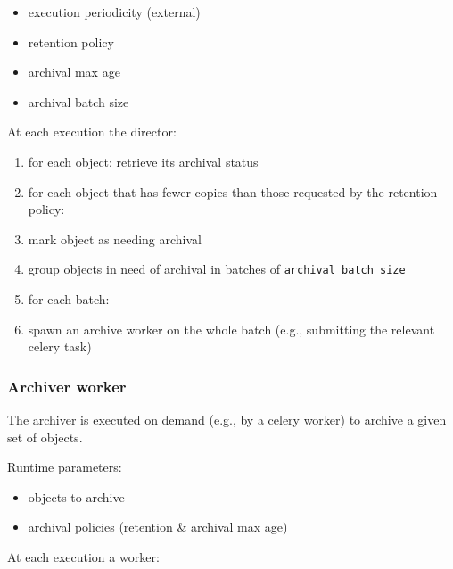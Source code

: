 \begin{itemize}
\itemsep1pt\parskip0pt
\item
  execution periodicity (external)
\item
  retention policy
\item
  archival max age
\item
  archival batch size
\end{itemize}

At each execution the director:

\begin{enumerate}
\def\labelenumi{\arabic{enumi}.}
\itemsep1pt\parskip0pt
\item
  for each object: retrieve its archival status
\item
  for each object that has fewer copies than those requested by the
  retention policy:
\item
  mark object as needing archival
\item
  group objects in need of archival in batches of
  \texttt{archival batch size}
\item
  for each batch:
\item
  spawn an archive worker on the whole batch (e.g., submitting the
  relevant celery task)
\end{enumerate}

\subsubsection{Archiver worker}\label{archiver-worker-1}

The archiver is executed on demand (e.g., by a celery worker) to archive
a given set of objects.

Runtime parameters:

\begin{itemize}
\itemsep1pt\parskip0pt
\item
  objects to archive
\item
  archival policies (retention \& archival max age)
\end{itemize}

At each execution a worker:

